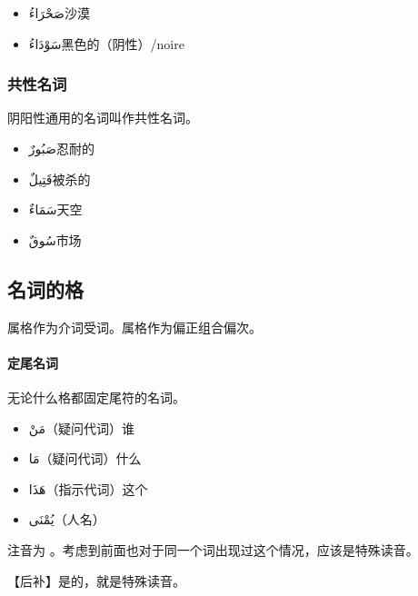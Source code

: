 \begin{multicols}{2}
    \begin{itemize}
        \item \ac{صَحْرَاءُ}{沙漠}
        \item \ac{سَوْدَاءُ}{黑色的（阴性）/noire}
    \end{itemize}
\end{multicols}

\subsubsection{共性名词}

阴阳性通用的名词叫作共性名词。

\begin{multicols}{2}
    \begin{itemize}
        \item \ac{صَبُورٌ}{忍耐的}
        \item \ac{قَتِيلٌ}{被杀的}
        \item \ac{سَمَاءٌ}{天空}
        \item \ac{سُوقٌ}{市场}
    \end{itemize}
\end{multicols}

\subsection{名词的格}

属格作为介词受词。属格作为偏正组合偏次。

\paragraph{定尾名词} 无论什么格都固定尾符的名词。

\begin{multicols}{2}
    \begin{itemize}
        \item \ac{مَنْ}{（疑问代词）谁}
        \item \ac{مَا}{（疑问代词）什么}
        \item \ac{هَذَا}{（指示代词）这个}
        \item \ac{يُمْنَى}{（人名）}
    \end{itemize}
\end{multicols}

\begin{note}
     注音为  。考虑到前面也对于同一个词出现过这个情况，应该是特殊读音。

    【后补】是的，就是特殊读音。
\end{note}

